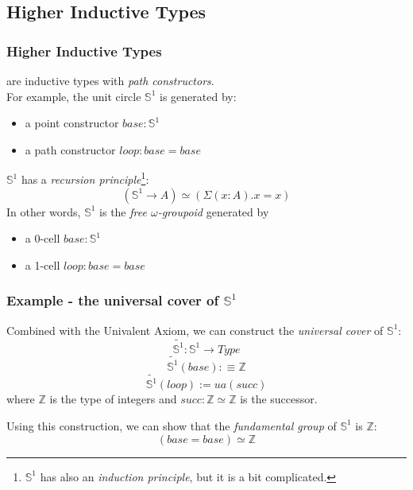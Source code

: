 \documentclass[dvipdfmx]{beamer}
\begin{document}
\subsection{Higher Inductive Types}

\begin{frame}
  \frametitle{Higher Inductive Types}
  are inductive types with {\it path constructors}. \\
  For example, the unit circle ${\mathbb S}^1$ is generated by:
  \begin{itemize}
    \item a point constructor $base : {\mathbb S}^1$
    \item a path constructor $loop : base = base$
  \end{itemize}
  ${\mathbb S}^1$ has a {\it recursion principle}\footnote{
    ${\mathbb S}^1$ has also an {\it induction principle},
    but it is a bit complicated.}:
  $$
  \left( {\mathbb S}^1 \to A \right) \simeq
  \left( \Sigma \left( x : A \right) . x = x \right)
  $$
  In other words, ${\mathbb S}^1$ is the {\it free $\omega$-groupoid}
  generated by
  \begin{itemize}
    \item a 0-cell $base : {\mathbb S}^1$
    \item a 1-cell $loop : base = base$
  \end{itemize}
\end{frame}

\begin{frame}
  \frametitle{Example - the universal cover of ${\mathbb S}^1$}
  Combined with the Univalent Axiom,
  we can construct the {\it universal cover} of ${\mathbb S}^1$:
  $$
    \widetilde{ {\mathbb S}^1 } : {\mathbb S}^1 \to Type
  $$
  $$
    \widetilde{ {\mathbb S}^1 } \left( base \right) :\equiv {\mathbb Z}
  $$
  $$
    \widetilde{ {\mathbb S}^1 } \left( loop \right) := ua \left( succ \right)
  $$
  where ${\mathbb Z}$ is the type of integers
  and $succ : {\mathbb Z} \simeq {\mathbb Z}$ is the successor.

  Using this construction, we can show that
  the {\it fundamental group} of ${\mathbb S}^1$ is ${\mathbb Z}$:
  $$
  \left( base = base \right) \simeq {\mathbb Z}
  $$
\end{frame}
\end{document}

